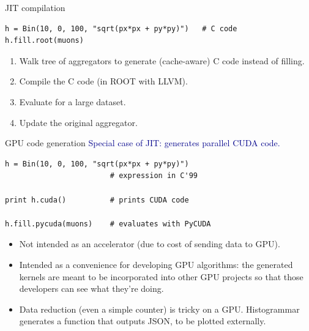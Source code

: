 \documentclass[aspectratio=169]{beamer}
\begin{document}
\begin{frame}[fragile]{JIT compilation}
\begin{verbatim}
h = Bin(10, 0, 100, "sqrt(px*px + py*py)")   # C code
h.fill.root(muons)
\end{verbatim}

\begin{enumerate}\setlength{\itemsep}{0.3 cm}
\item Walk tree of aggregators to generate (cache-aware) C code instead of filling.
\item Compile the C code (in ROOT with LLVM).
\item Evaluate for a large dataset.
\item Update the original aggregator.
\end{enumerate}

\vspace{0.25 cm}
\end{frame}

\begin{frame}[fragile]{GPU code generation}
\vspace{0.5 cm}
\textcolor{darkblue}{\large Special case of JIT: generates parallel CUDA code.}

\begin{center}
\begin{minipage}{0.7\linewidth}
\small
\begin{verbatim}
h = Bin(10, 0, 100, "sqrt(px*px + py*py)")
                        # expression in C'99

print h.cuda()          # prints CUDA code

h.fill.pycuda(muons)    # evaluates with PyCUDA
\end{verbatim}
\end{minipage}
\end{center}

\large
\begin{itemize}
\item<2-> Not intended as an accelerator (due to cost of sending data to GPU).
\item<3-> Intended as a convenience for developing GPU algorithms: the generated kernels are meant to be incorporated into other GPU projects so that those developers can see what they're doing.
\item<4-> Data reduction (even a simple counter) is tricky on a GPU. Histogrammar generates a function that outputs JSON, to be plotted externally.
\end{itemize}
\end{frame}
\end{document}
